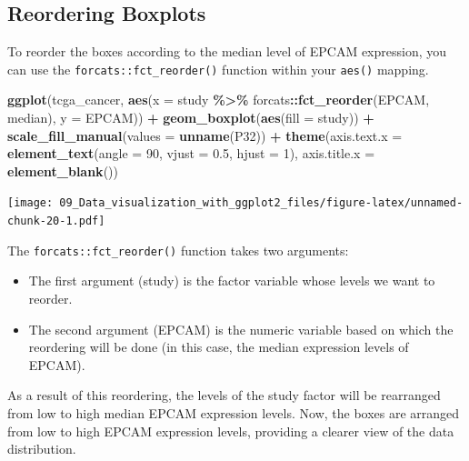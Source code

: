 \documentclass[
]{book}
\newenvironment{Shaded}{\begin{snugshade}}{\end{snugshade}}
\newcommand{\AttributeTok}[1]{\textcolor[rgb]{0.13,0.29,0.53}{#1}}
\newcommand{\DecValTok}[1]{\textcolor[rgb]{0.00,0.00,0.81}{#1}}
\newcommand{\FloatTok}[1]{\textcolor[rgb]{0.00,0.00,0.81}{#1}}
\newcommand{\FunctionTok}[1]{\textcolor[rgb]{0.13,0.29,0.53}{\textbf{#1}}}
\newcommand{\NormalTok}[1]{#1}
\newcommand{\SpecialCharTok}[1]{\textcolor[rgb]{0.81,0.36,0.00}{\textbf{#1}}}
\begin{document}
\hypertarget{reordering-boxplots}{%
\subsection{Reordering Boxplots}\label{reordering-boxplots}}

To reorder the boxes according to the median level of EPCAM expression, you can use the \texttt{forcats::fct\_reorder()} function within your \texttt{aes()} mapping.

\begin{Shaded}
\begin{Highlighting}[]
\FunctionTok{ggplot}\NormalTok{(tcga\_cancer, }\FunctionTok{aes}\NormalTok{(}\AttributeTok{x =}\NormalTok{ study }\SpecialCharTok{\%\textgreater{}\%}
\NormalTok{                          forcats}\SpecialCharTok{::}\FunctionTok{fct\_reorder}\NormalTok{(EPCAM, median), }
                        \AttributeTok{y =}\NormalTok{ EPCAM)) }\SpecialCharTok{+}
  \FunctionTok{geom\_boxplot}\NormalTok{(}\FunctionTok{aes}\NormalTok{(}\AttributeTok{fill =}\NormalTok{ study)) }\SpecialCharTok{+}
  \FunctionTok{scale\_fill\_manual}\NormalTok{(}\AttributeTok{values =} \FunctionTok{unname}\NormalTok{(P32)) }\SpecialCharTok{+}
  \FunctionTok{theme}\NormalTok{(}\AttributeTok{axis.text.x =} \FunctionTok{element\_text}\NormalTok{(}\AttributeTok{angle =} \DecValTok{90}\NormalTok{, }\AttributeTok{vjust =} \FloatTok{0.5}\NormalTok{, }\AttributeTok{hjust =} \DecValTok{1}\NormalTok{),}
        \AttributeTok{axis.title.x =} \FunctionTok{element\_blank}\NormalTok{())}
\end{Highlighting}
\end{Shaded}

\texttt{[image: 09\_Data\_visualization\_with\_ggplot2\_files/figure-latex/unnamed-chunk-20-1.pdf]}

The \texttt{forcats::fct\_reorder()} function takes two arguments:

\begin{itemize}
\item
  The first argument (study) is the factor variable whose levels we want to reorder.
\item
  The second argument (EPCAM) is the numeric variable based on which the reordering will be done (in this case, the median expression levels of EPCAM).
\end{itemize}

As a result of this reordering, the levels of the study factor will be rearranged from low to high median EPCAM expression levels. Now, the boxes are arranged from low to high EPCAM expression levels, providing a clearer view of the data distribution.
\end{document}
